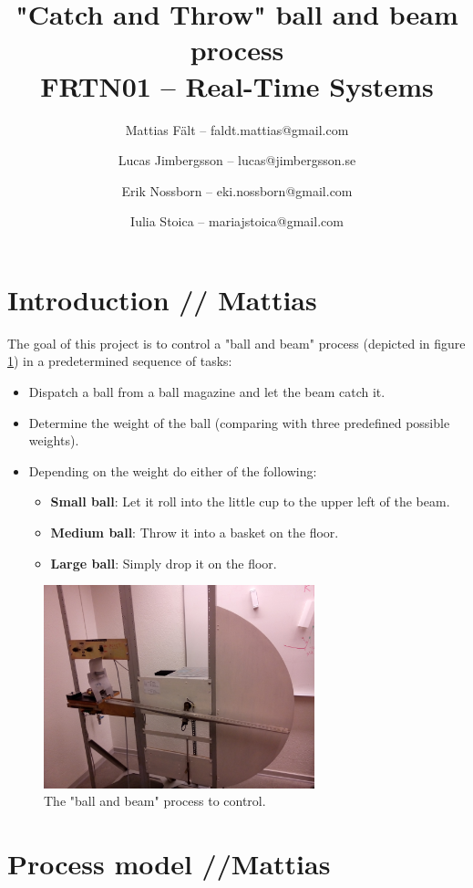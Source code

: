 \documentclass{article}
\title{"Catch and Throw" ball and beam process\\FRTN01 -- Real-Time Systems}
\author{
Mattias Fält -- faldt.mattias@gmail.com
\and
Lucas Jimbergsson -- lucas@jimbergsson.se
\and
Erik Nossborn -- eki.nossborn@gmail.com
\and
Iulia Stoica -- mariajstoica@gmail.com
}
\begin{document}
\maketitle
\newpage

\tableofcontents
\newpage

\section{Introduction // Mattias}
The goal of this project is to control a "ball and beam" process (depicted in figure \ref{fig:process}) in a predetermined sequence of tasks:
\begin{itemize}
\item Dispatch a ball from a ball magazine and let the beam catch it.
\item Determine the weight of the ball (comparing with three predefined possible weights).
\item Depending on the weight do either of the following:
\begin{itemize}
\item \textbf{Small ball}: Let it roll into the little cup to the upper left of the beam.
\item \textbf{Medium ball}: Throw it into a basket on the floor.
\item \textbf{Large ball}: Simply drop it on the floor.
\end{itemize}
\end{itemize}
\begin{figure}
\centering
\includegraphics[width=0.7\textwidth]{figures/process_fig.jpg}
\caption{The "ball and beam" process to control.}\label{fig:process}
\end{figure}

\section{Process model //Mattias}

\end{document}
